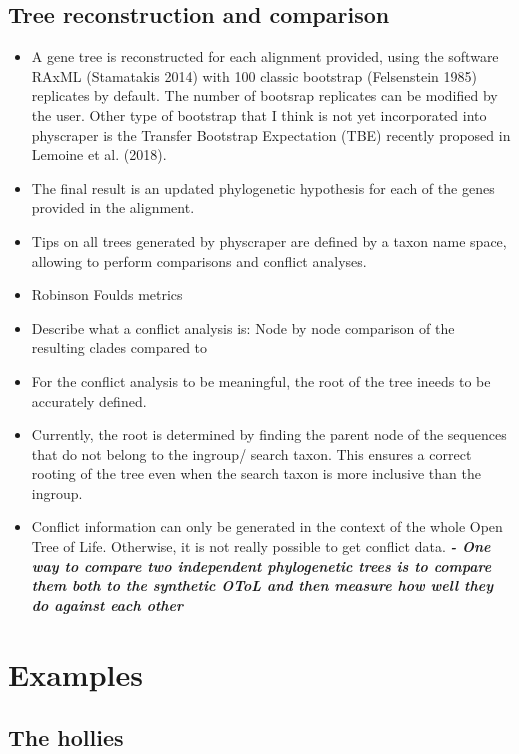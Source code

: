 \documentclass[draft]{ametsoc}
\begin{document}
\hypertarget{tree-reconstruction-and-comparison}{%
\subsection{Tree reconstruction and
comparison}\label{tree-reconstruction-and-comparison}}

\begin{itemize}
\tightlist
\item
  A gene tree is reconstructed for each alignment provided, using the
  software RAxML (Stamatakis 2014) with 100 classic bootstrap
  (Felsenstein 1985) replicates by default. The number of bootsrap
  replicates can be modified by the user. Other type of bootstrap that I
  think is not yet incorporated into physcraper is the Transfer
  Bootstrap Expectation (TBE) recently proposed in Lemoine et al.
  (2018).
\item
  The final result is an updated phylogenetic hypothesis for each of the
  genes provided in the alignment.
\item
  Tips on all trees generated by physcraper are defined by a taxon name
  space, allowing to perform comparisons and conflict analyses.
\item
  Robinson Foulds metrics
\item
  Describe what a conflict analysis is: Node by node comparison of the
  resulting clades compared to
\item
  For the conflict analysis to be meaningful, the root of the tree
  ineeds to be accurately defined.
\item
  Currently, the root is determined by finding the parent node of the
  sequences that do not belong to the ingroup/ search taxon. This
  ensures a correct rooting of the tree even when the search taxon is
  more inclusive than the ingroup.
\item
  Conflict information can only be generated in the context of the whole
  Open Tree of Life. Otherwise, it is not really possible to get
  conflict data. \textbf{\emph{- One way to compare two independent
  phylogenetic trees is to compare them both to the synthetic OToL and
  then measure how well they do against each other}}
\end{itemize}

\hypertarget{examples}{%
\section{Examples}\label{examples}}

\hypertarget{the-hollies}{%
\subsection{The hollies}\label{the-hollies}}
\end{document}
